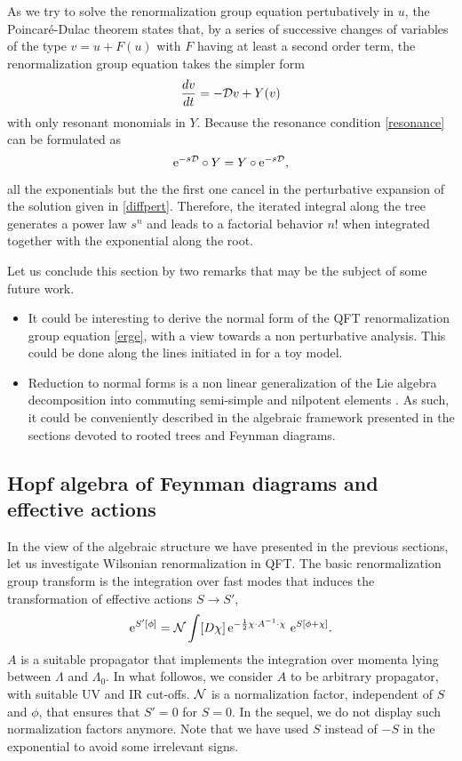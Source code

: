 \documentclass[12pt,here,feynmf]{article}
\begin{document}
As we try to solve the renormalization group equation pertubatively in $u$, the Poincar\'e-Dulac theorem states that, by a series of successive changes of variables of the type $v=u+F(u)$ with $F$ having at least a second order term, the renormalization group equation takes  the simpler form
\begin{equation}
\frac{dv}{dt}=-{\cal D}v+Y(v)\label{non linear}
\end{equation}
with only resonant monomials in $Y$. Because the resonance condition \eqref{resonance} can be formulated as 
\begin{equation}
\mathrm{e}^{-s{\cal D}}\circ Y=Y\circ\mathrm{e}^{-s{\cal D}},
\end{equation}
all the exponentials but the the first one cancel in the perturbative expansion of the solution given in \eqref{diffpert}. Therefore, the iterated integral along the tree generates a power law $s^{n}$ and leads to a factorial behavior $n!$ when integrated together with the exponential along the root.

Let us conclude this section by two remarks that may be the subject of some future work.

\begin{itemize}
\item
It could be interesting to derive the  normal form of the QFT renormalization group equation \eqref{erge}, with a view towards a non perturbative analysis. This could be done along the lines initiated in \cite{lebellac} for a toy model.
\item
Reduction to  normal forms is a non linear generalization of the Lie algebra decomposition into commuting semi-simple and nilpotent elements \cite{arnold}. As such, it could be conveniently described in the algebraic framework presented in the sections devoted to rooted trees and Feynman diagrams.

\end{itemize}

\subsection{Hopf algebra of Feynman diagrams and effective actions}

In the view of the algebraic structure we have presented in the previous sections, let us investigate Wilsonian renormalization in QFT. The basic renormalization group transform is the integration over fast modes that induces the transformation of effective actions $S\rightarrow S'$,
\begin{equation}
\mathrm{e}^{S'[\phi]}={\cal N}
\int[D\chi]\,\mathrm{e}^{-\frac{1}{2}\chi\cdot A^{-1}\cdot \chi}\,
\,\mathrm{e}^{S[\phi+\chi]}.
\end{equation}
$A$ is a suitable propagator that implements the integration over momenta lying between $\Lambda$ and $\Lambda_{0}$. In what followos, we consider $A$ to be arbitrary propagator, with suitable UV and IR cut-offs. ${\cal N}$ is a normalization factor, independent of $S$ and $\phi$, that ensures that $S'=0$ for $S=0$. In the sequel, we do not display such normalization factors anymore. Note that we have used $S$ instead of $-S$ in the exponential to avoid some irrelevant signs.
\end{document}
